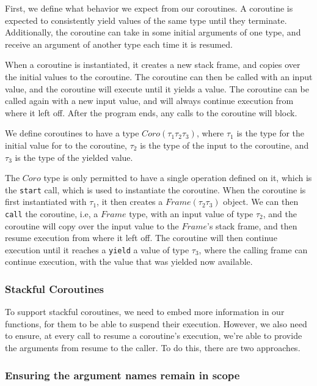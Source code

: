 \documentclass[review,twocolumn]{sigplanconf}
\begin{document}
First, we define what behavior we expect from our coroutines. A coroutine is expected to consistently yield values of the same type until they terminate. Additionally, the coroutine can take in some initial arguments of one type, and receive an argument of another type each time it is resumed.

When a coroutine is instantiated, it creates a new stack frame, and copies over the initial values to the coroutine. The coroutine can then be called with an input value, and the coroutine will execute until it yields a value. The coroutine can be called again with a new input value, and will always continue execution from where it left off. After the program ends, any calls to the coroutine will block.

We define coroutines to have a type $Coro({\tau_1}{\tau_2}{\tau_3})$, where $\tau_1$ is the type for the initial value for to the coroutine, $\tau_2$ is the type of the input to the coroutine, and $\tau_3$ is the type of the yielded value.

The $Coro$ type is only permitted to have a single operation defined on it, which is the \verb!start! call, which is used to instantiate the coroutine. When the coroutine is first instantiated with $\tau_1$, it then creates a $Frame({\tau_2}{\tau_3})$ object. We can then \verb!call! the coroutine, i.e, a $Frame$ type, with an input value of type $\tau_2$, and the coroutine will copy over the input value to the $Frame$'s stack frame, and then resume execution from where it left off. The coroutine will then continue execution until it reaches a \verb!yield! a value of type $\tau_3$, where the calling frame can continue execution, with the value that was yielded now available.

\subsubsection*{Stackful Coroutines}

To support stackful coroutines, we need to embed more information in our functions, for them to be able to suspend their execution. However, we also need to ensure, at every call to resume a coroutine's execution, we're able to provide the arguments from resume to the caller. To do this, there are two approaches.

\subsubsection{Ensuring the argument names remain in scope}
\end{document}
